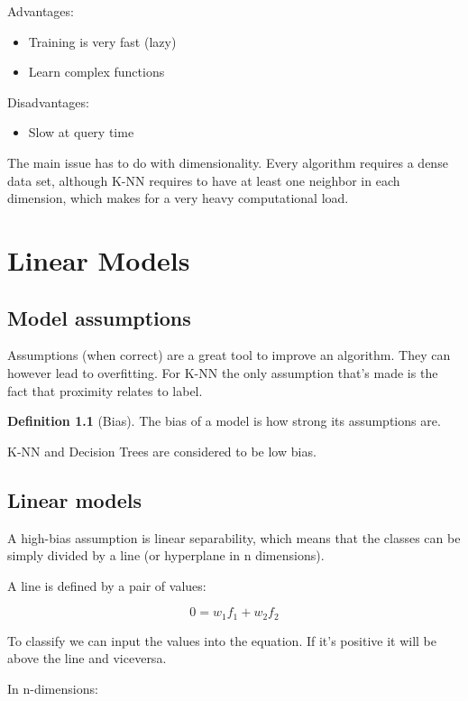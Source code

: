 \documentclass[oneside]{book}
\theoremstyle{definition}
\newtheorem{definition}{Definition}[section]
\begin{document}
Advantages:

\begin{itemize}
	\item Training is very fast (lazy)
	\item Learn complex functions
\end{itemize}

Disadvantages:

\begin{itemize}
	\item Slow at query time
\end{itemize}





The main issue has to do with dimensionality. Every algorithm requires a dense data set, although K-NN requires to have at least one neighbor in each dimension, which makes for a very heavy computational load.

\chapter{Linear Models}
\section{Model assumptions}
Assumptions (when correct) are a great tool to improve an algorithm. They can however lead to overfitting. For K-NN the only assumption that's made is the fact that proximity relates to label. 

\begin{definition}[Bias]
	The bias of a model is how strong its assumptions are.
\end{definition}

K-NN and Decision Trees are considered to be low bias. 

\section{Linear models}
A high-bias assumption is linear separability, which means that the classes can be simply divided by a line (or hyperplane in n dimensions).

A line is defined by a pair of values: 

\[
0 = w_1f_1 + w_2f_2
\]

To classify we can input the values into the equation. If it's positive it will be above the line and viceversa.

In n-dimensions: 
\end{document}
